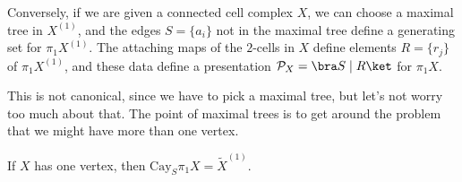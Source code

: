 \documentclass[a4paper]{article}
\newcommand\Cay{\mathrm{Cay}}
\begin{document}
Conversely, if we are given a connected cell complex $X$, we can choose a maximal tree in $X^{(1)}$, and the edges $S = \{a_i\}$ not in the maximal tree define a generating set for $\pi_1 X^{(1)}$. The attaching maps of the $2$-cells in $X$ define elements $R = \{r_j\}$ of $\pi_1 X^{(1)}$, and these data define a presentation $\mathcal{P}_X = \bra S \mid R\ket$ for $\pi_1 X$.

This is not canonical, since we have to pick a maximal tree, but let's not worry too much about that. The point of maximal trees is to get around the problem that we might have more than one vertex.

\begin{ex}
  If $X$ has one vertex, then $\Cay_S \pi_1 X = \tilde{X}^{(1)}$.
\end{ex}

\printindex
\end{document}
